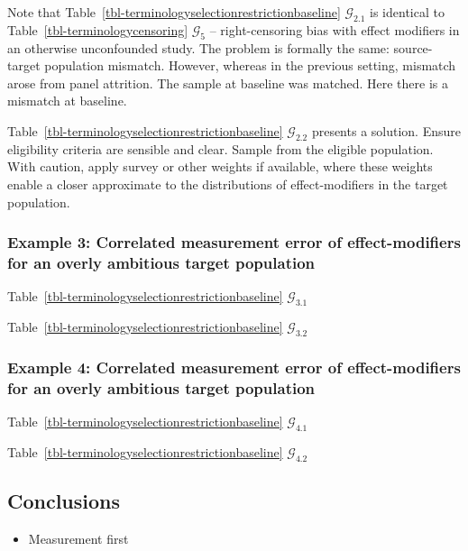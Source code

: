 \documentclass[
  single column]{article}
\providecommand{\tightlist}{%
  \setlength{\itemsep}{0pt}\setlength{\parskip}{0pt}}\usepackage{longtable,booktabs,array}
\begin{document}
Note that Table~\ref{tbl-terminologyselectionrestrictionbaseline}
\(\mathcal{G}_{2.1}\) is identical to
Table~\ref{tbl-terminologycensoring} \(\mathcal{G}_5\) --
right-censoring bias with effect modifiers in an otherwise unconfounded
study. The problem is formally the same: source-target population
mismatch. However, whereas in the previous setting, mismatch arose from
panel attrition. The sample at baseline was matched. Here there is a
mismatch at baseline.

Table~\ref{tbl-terminologyselectionrestrictionbaseline}
\(\mathcal{G}_{2.2}\) presents a solution. Ensure eligibility criteria
are sensible and clear. Sample from the eligible population. With
caution, apply survey or other weights if available, where these weights
enable a closer approximate to the distributions of effect-modifiers in
the target population.

\subsubsection{Example 3: Correlated measurement error of
effect-modifiers for an overly ambitious target
population}\label{example-3-correlated-measurement-error-of-effect-modifiers-for-an-overly-ambitious-target-population}

Table~\ref{tbl-terminologyselectionrestrictionbaseline}
\(\mathcal{G}_{3.1}\)

Table~\ref{tbl-terminologyselectionrestrictionbaseline}
\(\mathcal{G}_{3.2}\)

\subsubsection{Example 4: Correlated measurement error of
effect-modifiers for an overly ambitious target
population}\label{example-4-correlated-measurement-error-of-effect-modifiers-for-an-overly-ambitious-target-population}

Table~\ref{tbl-terminologyselectionrestrictionbaseline}
\(\mathcal{G}_{4.1}\)

Table~\ref{tbl-terminologyselectionrestrictionbaseline}
\(\mathcal{G}_{4.2}\)

\subsection{Conclusions}\label{conclusions}

\begin{itemize}
\tightlist
\item
  Measurement first
\end{itemize}
\end{document}
